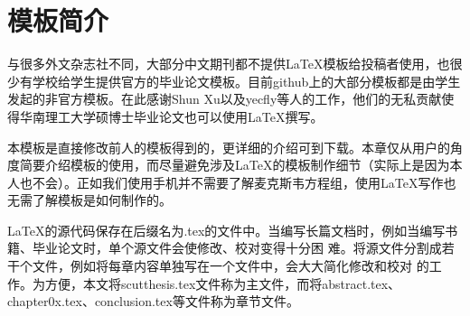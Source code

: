 \chapter{模板简介}
%
与很多外文杂志社不同，大部分中文期刊都不提供\LaTeX{}模板给投稿者使用，也很少有学校给学生提供官方的毕业论文模板。目前github上的大部分模板都是由学生发起的非官方模板。在此感谢Shun Xu以及yecfly等人的工作，他们的无私贡献使得华南理工大学硕博士毕业论文也可以使用\LaTeX{}撰写。

本模板是直接修改前人的模板得到的，更详细的介绍可到\parencite{_,_a}下载。本章仅从用户的角度简要介绍模板的使用，而尽量避免涉及\LaTeX{}的模板制作细节（实际上是因为本人也不会）。正如我们使用手机并不需要了解麦克斯韦方程组，使用\LaTeX{}写作也无需了解模板是如何制作的。

\LaTeX{}的源代码保存在后缀名为.tex的文件中。当编写长篇文档时，例如当编写书籍、毕业论文时，单个源文件会使修改、校对变得十分困
难。将源文件分割成若干个文件，例如将每章内容单独写在一个文件中，会大大简化修改和校对
的工作。为方便，本文将scutthesis.tex文件称为主文件，而将abstract.tex、chapter0x.tex、conclusion.tex等文件称为章节文件。

